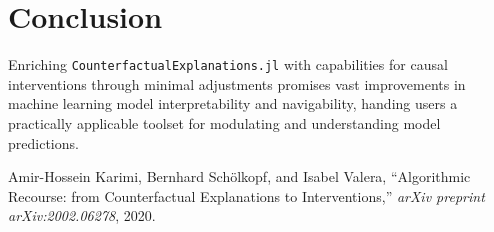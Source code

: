 \documentclass[a4paper,12pt]{article}
\begin{document}
\section{Conclusion}
Enriching \texttt{CounterfactualExplanations.jl} with capabilities for causal interventions through minimal adjustments promises vast improvements in machine learning model interpretability and navigability, handing users a practically applicable toolset for modulating and understanding model predictions.

\begin{thebibliography}{9}
Amir-Hossein Karimi, Bernhard Schölkopf, and Isabel Valera,
``Algorithmic Recourse: from Counterfactual Explanations to Interventions,''
\textit{arXiv preprint arXiv:2002.06278}, 2020.
\end{thebibliography}
\end{document}

